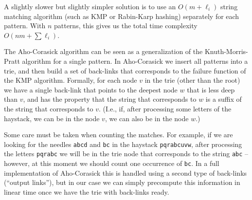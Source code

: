 A slightly slower but slightly simpler solution is to use an $O(m+\ell_i)$ string matching 
algorithm (such as KMP or Rabin-Karp hashing) separately for each pattern. With $n$ patterns,
this gives us the total time complexity $O(nm + \sum\ell_i)$.


The Aho-Corasick algorithm can be seen as a generalization of the Knuth-Morris-Pratt algorithm
for a single pattern. In Aho-Corasick we insert all patterns into a trie, and then build a set
of back-links that corresponds to the failure function of the KMP algorithm. Formally, for each
node $v$ in the trie (other than the root) we have a single back-link that points to the deepest
node $w$ that is less deep than $v$, and has the property that the string that corresponds to $w$
is a suffix of the string that corresponds to $v$. (I.e., if, after processing some letters 
of the haystack, we can be in the node $v$, we can also be in the node $w$.)

Some care must be taken when counting the matches. For example, if we are looking for the needles
\verb!abcd! and \verb!bc! in the haystack \verb!pqrabcuvw!, after processing the letters
\verb!pqrabc! we will be in the trie node that corresponds to the string \verb!abc! -- however,
at this moment we should count one occurrence of \verb!bc!. In a full implementation of Aho-Corasick
this is handled using a second type of back-links (``output links''), but in our case we can simply
precompute this information in linear time once we have the trie with back-links ready.

